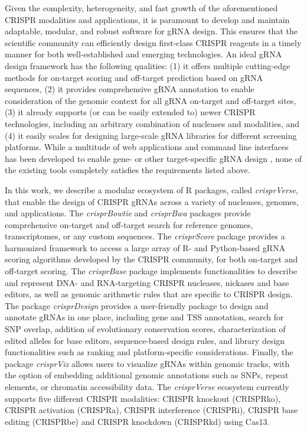 \documentclass[pdftex,english,10pt]{article}
\begin{document}
Given the complexity, heterogeneity, and fast growth of the aforementioned CRISPR modalities and applications, it is paramount to develop and maintain adaptable, modular, and robust software for gRNA design. This ensures that the scientific community can efficiently design first-class CRISPR reagents in a timely manner for both well-established and emerging technologies. An ideal gRNA design framework has the following qualities: (1) it offers multiple cutting-edge methods for on-target scoring and off-target prediction based on gRNA sequences, (2) it provides comprehensive gRNA annotation to enable consideration of the genomic context for all gRNA on-target and off-target sites, (3) it already supports (or can be easily extended to) newer CRISPR technologies, including an arbitrary combination of nucleases and modalities, and (4) it easily scales for designing large-scale gRNA libraries for different screening platforms. 
While a multitude of web applications and command line interfaces has been developed to enable gene- or other target-specific gRNA design \citep{ecrisp,crisprscan,guidescan,casoffinder, chopchop, crispor, cctop, flashfry,cld,multicrispr, crisprseek}, none of the existing tools completely satisfies the requirements listed above.


In this work, we describe a modular ecosystem of R packages, called \textit{crisprVerse}, that enable the design of CRISPR gRNAs across a variety of nucleases, genomes, and applications. The \textit{crisprBowtie} and \textit{crisprBwa} packages provide comprehensive on-target and off-target search for reference genomes, transcriptomes, or any custom sequences. The \textit{crisprScore} package provides a harmonized framework to access a large array of R- and Python-based gRNA scoring algorithms developed by the CRISPR community, for both on-target and off-target scoring. The \textit{crisprBase} package implements functionalities to describe and represent DNA- and RNA-targeting CRISPR  nucleases, nickases and base editors, as well as genomic arithmetic rules that are specific to CRISPR design. The package \textit{crisprDesign} provides a user-friendly package to design and annotate gRNAs in one place, including gene and TSS annotation, search for SNP overlap, addition of evolutionary conservation scores, characterization of edited alleles for base editors, sequence-based design rules, and library design functionalities such as ranking and platform-specific considerations. Finally, the package \textit{crisprViz} allows users to visualize gRNAs within genomic tracks, with the option of embedding additional genomic annotations such as SNPs, repeat elements, or chromatin accessibility data. The \textit{crisprVerse} ecosystem currently supports five different CRISPR modalities: CRISPR knockout (CRISPRko), CRISPR activation (CRISPRa), CRISPR interference (CRISPRi), CRISPR base editing (CRISPRbe) and CRISPR knockdown (CRISPRkd) using Cas13.  
\end{document}
